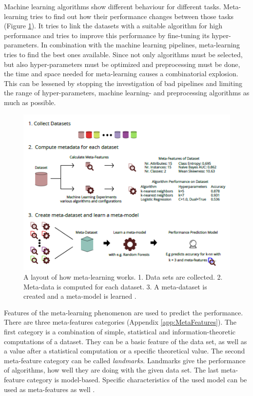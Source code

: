 \documentclass[10pt,a4paper]{report}
\begin{document}
	Machine learning algorithms show different behaviour for different tasks. Meta-learning tries to find out how their performance changes between those tasks (Figure \ref{fig:Meta-LearningLayout}). It tries to link the datasets with a suitable algorithm for high performance and tries to improve this performance by fine-tuning its hyper-parameters. In combination with the machine learning pipelines, meta-learning tries to find the best ones available. Since not only algorithms must be selected, but also hyper-parameters must be optimized and preprocessing must be done, the time and space needed for meta-learning causes a combinatorial explosion. This can be lessened by stopping the investigation of bad pipelines and limiting the range of hyper-parameters, machine learning- and preprocessing algorithms as much as possible. 
	
	\begin{figure}
		
		\includegraphics[scale=1]{Meta-LearningLayout.png}
		\caption{A layout of how meta-learning works. 1. Data sets are collected. 2. Meta-data is computed for each dataset. 3. A meta-dataset is created and a meta-model is learned \cite{Gijsbers2017Thesis}.}
		\label{fig:Meta-LearningLayout}
	\end{figure}
	
	Features of the meta-learning phenomenon are used to predict the performance. There are three meta-features categories (Appendix \ref{app:MetaFeatures}). The first category is a combination of simple, statistical and information-theoretic computations of a dataset. They can be a basic feature of the data set, as well as a value after a statistical computation or a specific theoretical value. The second meta-feature category can be called \textit{landmarks}. Landmarks give the performance of algorithms, how well they are doing with the given data set. The last meta-feature category is model-based. Specific characteristics of the used model can be used as meta-features as well \cite{brazdil1994characterizing, vilalta2004using}.
	
\end{document}
